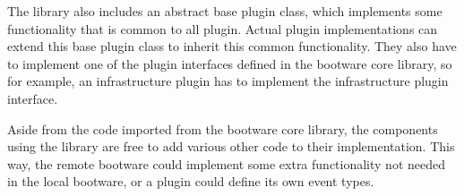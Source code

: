 The library also includes an abstract base plugin class, which implements some functionality that is common to all plugin.
Actual plugin implementations can extend this base plugin class to inherit this common functionality.
They also have to implement one of the plugin interfaces defined in the bootware core library, so for example, an infrastructure plugin has to implement the infrastructure plugin interface.

Aside from the code imported from the bootware core library, the components using the library are free to add various other code to their implementation.
This way, the remote bootware could implement some extra functionality not needed in the local bootware, or a plugin could define its own event types.
